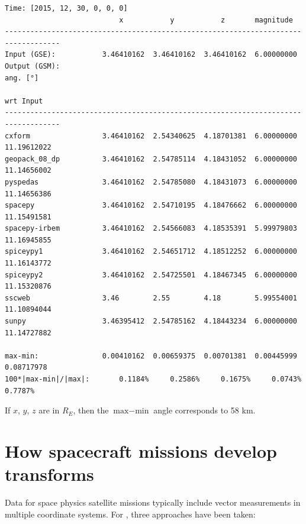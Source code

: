 \documentclass[draft]{agujournal2019}
\begin{document}
\small
\begin{verbatim}
Time: [2015, 12, 30, 0, 0, 0]
                           x           y           z       magnitude
-----------------------------------------------------------------------------------
Input (GSE):           3.46410162  3.46410162  3.46410162  6.00000000
Output (GSM):                                                         ang. [°]
                                                                      wrt Input
-----------------------------------------------------------------------------------
cxform                 3.46410162  2.54340625  4.18701381  6.00000000 11.19612022
geopack_08_dp          3.46410162  2.54785114  4.18431052  6.00000000 11.14656002
pyspedas               3.46410162  2.54785080  4.18431073  6.00000000 11.14656386
spacepy                3.46410162  2.54710195  4.18476662  6.00000000 11.15491581
spacepy-irbem          3.46410162  2.54566083  4.18535391  5.99979803 11.16945855
spiceypy1              3.46410162  2.54651712  4.18512252  6.00000000 11.16143772
spiceypy2              3.46410162  2.54725501  4.18467345  6.00000000 11.15320876
sscweb                 3.46        2.55        4.18        5.99554001 11.10894044
sunpy                  3.46395412  2.54785162  4.18443234  6.00000000 11.14727882

max-min:               0.00410162  0.00659375  0.00701381  0.00445999  0.08717978
100*|max-min|/|max|:       0.1184%     0.2586%     0.1675%     0.0743%     0.7787%
\end{verbatim}
\normalsize

\noindent
If $x$, $y$, $z$ are in $R_E$, then the $\mbox{max}-\mbox{min}$ angle corresponds to 58 km.

\section{How spacecraft missions develop transforms}
\label{sect:missions}

Data for space physics satellite missions typically include vector measurements in multiple coordinate systems. For , three approaches have been taken:
\end{document}
